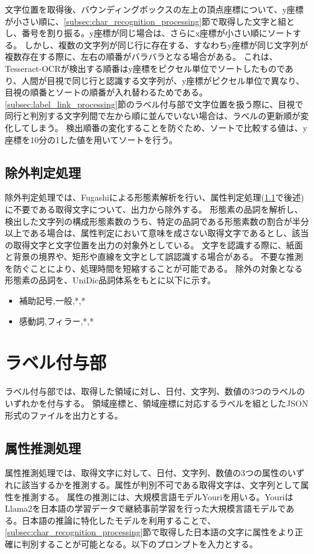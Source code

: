 文字位置を取得後、バウンディングボックスの左上の頂点座標について、y座標が小さい順に、\ref{subsec:char_recognition_processing}節で取得した文字と組とし、番号を割り振る。y座標が同じ場合は、さらにx座標が小さい順にソートする。
しかし、複数の文字列が同じ行に存在する、すなわちy座標が同じ文字列が複数存在する際に、左右の順番がバラバラとなる場合がある。
これは、Tesseract-OCRが検出する順番はy座標をピクセル単位でソートしたものであり、人間が目視で同じ行と認識する文字列が、y座標がピクセル単位で異なり、目視の順番とソートの順番が入れ替わるためである。
\ref{subsec:label_link_processing}節のラベル付与部で文字位置を扱う際に、目視で同行と判別する文字列間で左から順に並んでいない場合は、ラベルの更新順が変化してしまう。
検出順番の変化することを防ぐため、ソートで比較する値は、y座標を10分の1した値を用いてソートを行う。


\subsection{除外判定処理}\label{subsec:exclusion_judgement_processing}
除外判定処理では、Fugashiによる形態素解析を行い、属性判定処理(\ref{subsec:att_prediction_processing}で後述)に不要である取得文字について、出力から除外する。
形態素の品詞を解析し、検出した文字列の構成形態素数のうち、特定の品詞である形態素数の割合が半分以上である場合は、属性判定において意味を成さない取得文字であるとし、該当の取得文字と文字位置を出力の対象外としている。
文字を認識する際に、紙面と背景の境界や、矩形や直線を文字として誤認識する場合がある。
不要な推測を防ぐことにより、処理時間を短縮することが可能である。
除外の対象となる形態素の品詞を、UniDic品詞体系をもとに以下に示す。

\begin{itemize}
    \item 補助記号,一般,*,*
    \item 感動詞,フィラー,*,*
\end{itemize}


\section{ラベル付与部}\label{sec:label_link_part}
ラベル付与部では、取得した領域に対し、日付、文字列、数値の3つのラベルのいずれかを付与する。
領域座標と、領域座標に対応するラベルを組としたJSON形式のファイルを出力とする。


\subsection{属性推測処理}\label{subsec:att_prediction_processing}
属性推測処理では、取得文字に対して、日付、文字列、数値の3つの属性のいずれに該当するかを推測する。属性が判別不可である取得文字は、文字列として属性を推測する。
属性の推測には、大規模言語モデルYouriを用いる。YouriはLlama2を日本語の学習データで継続事前学習を行った大規模言語モデルである。日本語の推論に特化したモデルを利用することで、\ref{subsec:char_recognition_processing}節で取得した日本語の文字に属性をより正確に判別することが可能となる。以下のプロンプトを入力とする。\\

